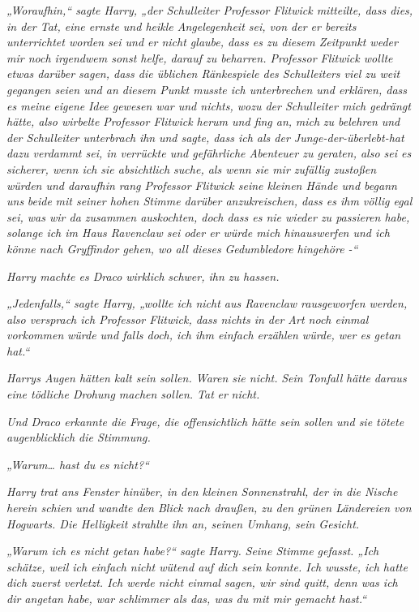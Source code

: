 {\emph{„Woraufhin,“ sagte Harry, „der Schulleiter Professor Flitwick mitteilte, dass dies, in der Tat, eine ernste und heikle Angelegenheit sei, von der er bereits unterrichtet worden sei und er nicht glaube, dass es zu diesem Zeitpunkt weder mir noch irgendwem sonst helfe, darauf zu beharren. Professor Flitwick wollte etwas darüber sagen, dass die üblichen Ränkespiele des Schulleiters viel zu weit gegangen seien und an diesem Punkt musste ich unterbrechen und erklären, dass es meine} \emph{\emph{eigene}} \emph{Idee gewesen war und nichts, wozu der Schulleiter mich gedrängt hätte, also wirbelte Professor Flitwick herum und fing an,} \emph{\emph{mich}} \emph{zu belehren} \emph{und der Schulleiter unterbrach} \emph{\emph{ihn}} \emph{und sagte, dass ich als der Junge-der-überlebt-hat dazu verdammt sei, in verrückte und gefährliche Abenteuer zu geraten, also sei es sicherer, wenn ich sie absichtlich suche, als wenn sie mir zufällig zustoßen würden und daraufhin rang Professor Flitwick seine kleinen Hände und begann uns} \emph{\emph{beide}} \emph{mit seiner hohen Stimme darüber anzukreischen, dass es ihm völlig egal sei, was wir da zusammen auskochten, doch dass es nie wieder zu passieren habe, solange ich im Haus Ravenclaw sei oder er würde mich hinauswerfen und ich könne nach Gryffindor gehen, wo all dieses} \emph{\emph{Gedumbledore}} \emph{hingehöre -“}

\emph{Harry machte es Draco} \emph{\emph{wirklich}} \emph{schwer, ihn zu hassen.}

\emph{„Jedenfalls,“ sagte Harry, „wollte ich nicht aus Ravenclaw rausgeworfen werden, also versprach ich Professor Flitwick, dass nichts in der Art noch einmal} \emph{vorkommen} \emph{würde und falls doch, ich ihm einfach erzählen würde, wer es getan hat.“}

\emph{Harrys Augen hätten kalt sein sollen. Waren sie nicht.} \emph{Sein Tonfall} \emph{hätte} \emph{daraus} \emph{eine tödliche Drohung machen sollen. Tat} \emph{er} \emph{nicht.}

\emph{Und Draco erkannte die Frage, die offensichtlich hätte sein sollen und sie tötete augenblicklich die Stimmung.}

\emph{„Warum… hast du es nicht?“}

\emph{Harry trat ans Fenster hinüber, in den kleinen Sonnenstrahl, der in die Nische herein schien und wandte den Blick nach draußen, zu den grünen Ländereien von Hogwarts. Die Helligkeit strahlte ihn an, seinen Umhang, sein Gesicht.}

\emph{„Warum ich es nicht getan habe?“ sagte Harry.} \emph{Seine Stimme gefasst. „Ich schätze, weil ich einfach nicht wütend auf dich sein konnte. Ich wusste, ich hatte dich zuerst verletzt. Ich werde nicht einmal sagen, wir sind quitt, denn was ich dir angetan habe, war schlimmer als das, was du mit mir gemacht hast.“}

}
